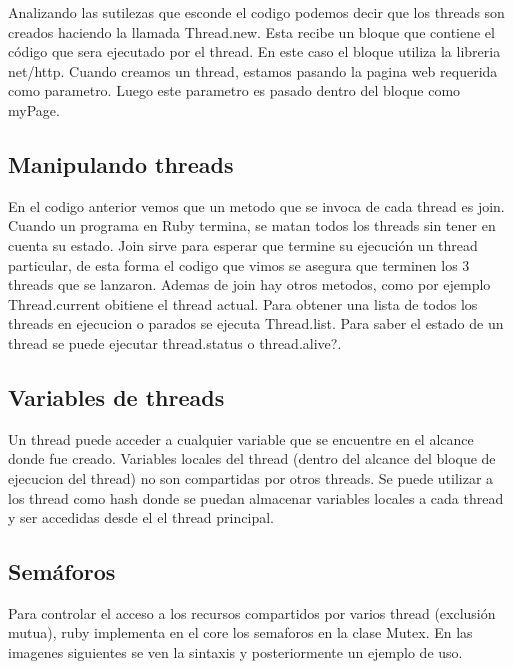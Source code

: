 \documentclass{article}
\begin{document}
 
\bigskip

Analizando las sutilezas que esconde el codigo podemos decir que los threads son creados haciendo la llamada Thread.new. Esta recibe un bloque que contiene el código que sera ejecutado por el thread. En este caso el bloque utiliza la libreria net/http.
Cuando creamos un thread, estamos pasando la pagina web requerida como parametro. Luego este parametro es pasado dentro del bloque como myPage.

\subsection{Manipulando threads}

En el codigo anterior vemos que un metodo que se invoca de cada thread es join. Cuando un programa en Ruby termina, se matan todos los threads sin tener en cuenta su estado. Join sirve para esperar que termine su ejecución un thread particular, de esta forma el codigo que vimos se asegura que terminen los 3 threads que se lanzaron.
Ademas de join hay otros metodos, como por ejemplo Thread.current obitiene el thread actual. Para obtener una lista de todos los threads en ejecucion o parados se ejecuta Thread.list. Para saber el estado de un thread se puede ejecutar thread.status o thread.alive?.


\subsection{Variables de threads}
Un thread puede acceder a cualquier variable que se encuentre en el alcance donde fue creado. Variables locales del thread (dentro del alcance del bloque de ejecucion del thread) no son compartidas por otros threads. Se puede utilizar a los thread como hash donde se puedan almacenar variables locales a cada thread y ser accedidas desde el el thread principal.

 
\bigskip

\subsection{Semáforos}

Para controlar el acceso a los recursos compartidos por varios thread (exclusión mutua), ruby implementa en el core los semaforos en la clase Mutex. En las imagenes siguientes se ven la sintaxis y posteriormente un ejemplo de uso.
\end{document}
